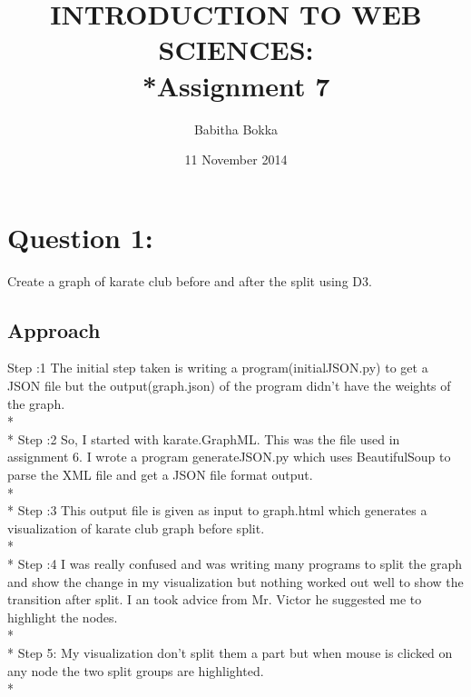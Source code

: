 \documentclass[12pt]{article}
\begin{document}
\begin{titlepage}
\title{INTRODUCTION TO WEB SCIENCES:\\*Assignment 7}
\author{Babitha Bokka}
\date{11 November 2014}
\maketitle
\end{titlepage}

\tableofcontents
\newpage
\section{Question 1:}
Create a graph of karate club before and after the split using D3.
\subsection{Approach}
 Step :1 The initial step taken is writing a program(initialJSON.py) to get a JSON file but the output(graph.json) of the program didn't have the weights of the graph.\\*\\*
Step :2  So, I started with karate.GraphML. This was the file used in assignment 6. I wrote a program generateJSON.py which uses BeautifulSoup to parse the XML file and get a JSON file format output.\\*\\*
Step :3  This output file is given as input to graph.html which generates a visualization of karate club graph before split.\\*\\*
Step :4 I was really confused and was writing many programs to split the graph and show the change in my visualization but nothing worked out well to show the  transition after split. I an took advice from Mr. Victor he suggested me to highlight the nodes.\\*\\*
Step 5: My visualization don't split them a part but when mouse is clicked on any node the two split groups are highlighted. \\*
\end{document}
